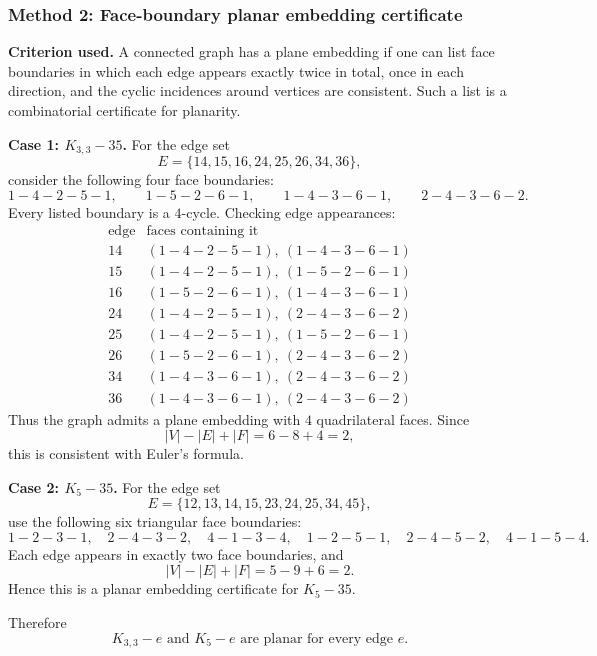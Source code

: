 \documentclass[12pt]{article}
\begin{document}
\subsubsection{Method 2: Face-boundary planar embedding certificate}
\textbf{Criterion used.} A connected graph has a plane embedding if one can list face boundaries in which each edge appears exactly twice in total, once in each direction, and the cyclic incidences around vertices are consistent. Such a list is a combinatorial certificate for planarity.

\medskip
\noindent\textbf{Case 1: $K_{3,3}-35$.}
For the edge set
\[
E=\{14,15,16,24,25,26,34,36\},
\]
consider the following four face boundaries:
\[
1-4-2-5-1,
\qquad
1-5-2-6-1,
\qquad
1-4-3-6-1,
\qquad
2-4-3-6-2.
\]
Every listed boundary is a $4$-cycle. Checking edge appearances:
\[
\begin{array}{c|c}
\text{edge} & \text{faces containing it}\\ \hline
14 & (1\!-\!4\!-\!2\!-\!5\!-\!1),\ (1\!-\!4\!-\!3\!-\!6\!-\!1)\\
15 & (1\!-\!4\!-\!2\!-\!5\!-\!1),\ (1\!-\!5\!-\!2\!-\!6\!-\!1)\\
16 & (1\!-\!5\!-\!2\!-\!6\!-\!1),\ (1\!-\!4\!-\!3\!-\!6\!-\!1)\\
24 & (1\!-\!4\!-\!2\!-\!5\!-\!1),\ (2\!-\!4\!-\!3\!-\!6\!-\!2)\\
25 & (1\!-\!4\!-\!2\!-\!5\!-\!1),\ (1\!-\!5\!-\!2\!-\!6\!-\!1)\\
26 & (1\!-\!5\!-\!2\!-\!6\!-\!1),\ (2\!-\!4\!-\!3\!-\!6\!-\!2)\\
34 & (1\!-\!4\!-\!3\!-\!6\!-\!1),\ (2\!-\!4\!-\!3\!-\!6\!-\!2)\\
36 & (1\!-\!4\!-\!3\!-\!6\!-\!1),\ (2\!-\!4\!-\!3\!-\!6\!-\!2)
\end{array}
\]
Thus the graph admits a plane embedding with $4$ quadrilateral faces. Since
\[
|V|-|E|+|F|=6-8+4=2,
\]
this is consistent with Euler's formula.

\medskip
\noindent\textbf{Case 2: $K_5-35$.}
For the edge set
\[
E=\{12,13,14,15,23,24,25,34,45\},
\]
use the following six triangular face boundaries:
\[
1-2-3-1,
\quad
2-4-3-2,
\quad
4-1-3-4,
\quad
1-2-5-1,
\quad
2-4-5-2,
\quad
4-1-5-4.
\]
Each edge appears in exactly two face boundaries, and
\[
|V|-|E|+|F|=5-9+6=2.
\]
Hence this is a planar embedding certificate for $K_5-35$.

Therefore
\[
\boxed{K_{3,3}-e\text{ and }K_5-e\text{ are planar for every edge }e.}
\]

\newpage
\end{document}
